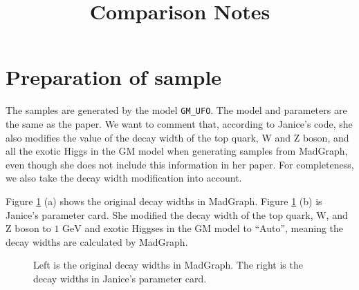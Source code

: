 \documentclass[12pt]{article}
\title{Comparison Notes}
\author{}
\date{}
\begin{document}
\maketitle
\section{Preparation of sample}%
\label{sec:preparation_of_sample}
	The samples are generated by the model \verb+GM_UFO+. The model and parameters are the same as the paper. We want to comment that, according to Janice's code, she also modifies the value of the decay width of the top quark, W and Z boson, and all the exotic Higgs in the GM model when generating samples from MadGraph, even though she does not include this information in her paper. For completeness, we also take the decay width modification into account.

	Figure \ref{fig:decay_width} (a) shows the original decay widths in MadGraph. Figure \ref{fig:decay_width} (b) is Janice's parameter card. She modified the decay width of the top quark, W, and Z boson to $\text{1 GeV}$ and exotic Higgses in the GM model to ``Auto'', meaning the decay widths are calculated by MadGraph.

	\begin{figure}[htpb]
		\centering
		\caption{Left is the original decay widths in MadGraph. The right is the decay widths in Janice's parameter card.}
		\label{fig:decay_width}
	\end{figure}
\end{document}
